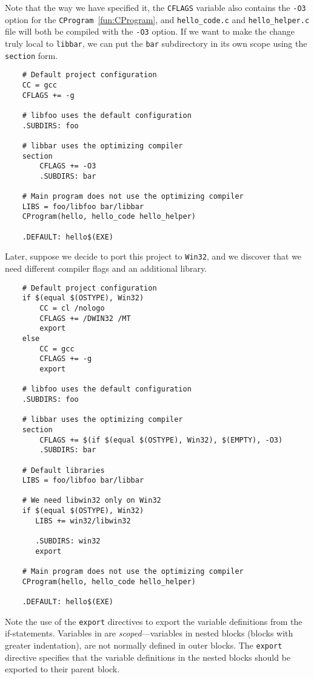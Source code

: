Note that the way we have specified it, the \verb+CFLAGS+ variable also contains the \verb+-O3+
option for the \verb+CProgram+~\ref{fun:CProgram}, and \verb+hello_code.c+ and \verb+hello_helper.c+ file will both be
compiled with the \verb+-O3+ option.  If we want to make the change truly local to \verb+libbar+, we
can put the \verb+bar+ subdirectory in its own scope using the \verb+section+ form.

\begin{verbatim}
    # Default project configuration
    CC = gcc
    CFLAGS += -g

    # libfoo uses the default configuration
    .SUBDIRS: foo

    # libbar uses the optimizing compiler
    section
        CFLAGS += -O3
        .SUBDIRS: bar

    # Main program does not use the optimizing compiler
    LIBS = foo/libfoo bar/libbar
    CProgram(hello, hello_code hello_helper)

    .DEFAULT: hello$(EXE)
\end{verbatim}

Later, suppose we decide to port this project to \verb+Win32+, and we discover that we need
different compiler flags and an additional library.

\begin{verbatim}
    # Default project configuration
    if $(equal $(OSTYPE), Win32)
        CC = cl /nologo
        CFLAGS += /DWIN32 /MT
        export
    else
        CC = gcc
        CFLAGS += -g
        export

    # libfoo uses the default configuration
    .SUBDIRS: foo

    # libbar uses the optimizing compiler
    section
        CFLAGS += $(if $(equal $(OSTYPE), Win32), $(EMPTY), -O3)
        .SUBDIRS: bar

    # Default libraries
    LIBS = foo/libfoo bar/libbar

    # We need libwin32 only on Win32
    if $(equal $(OSTYPE), Win32)
       LIBS += win32/libwin32

       .SUBDIRS: win32
       export

    # Main program does not use the optimizing compiler
    CProgram(hello, hello_code hello_helper)

    .DEFAULT: hello$(EXE)
\end{verbatim}

Note the use of the \verb+export+ directives to export the variable definitions from the
if-statements.  Variables in  are \emph{scoped}---variables in nested blocks (blocks
with greater indentation), are not normally defined in outer blocks.  The \verb+export+ directive
specifies that the variable definitions in the nested blocks should be exported to their parent
block.

